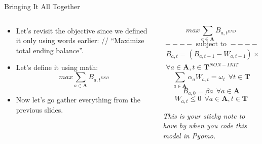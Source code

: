 \documentclass[10pt, aspectratio=169]{beamer}
\begin{document}
\begin{frame}{Bringing It All Together}
    \begin{columns}
        \begin{column}{0.5\textwidth}
            \begin{itemize}
                \item Let's revisit the objective since we defined it only using words earlier: // \enquote{Maximize total ending balance}.
                \item Let's define it using math:
                \pause
                $$max \sum_{a \in \textbf{A}} B_{a,t^{END}}$$
                \item Now let's go gather everything from the previous slides.
                \pause
            \end{itemize}
        \end{column}
        \begin{column}{0.5\textwidth}
            $$max \sum_{a \in \textbf{A}} B_{a,t^{END}}$$
            $$----\text{ subject to }----$$
            \begin{equation}
                \begin{split}
                B_{a,t} = \left(B_{a,t-1}-W_{a,t-1}\right) \times (1 + \delta_a) \\ \forall a \in \textbf{A}, t \in \textbf{T}^{NON-INIT}
                \end{split} \tag*{}
            \end{equation}
            $$\sum_{a \in \textbf{A}} \alpha_a W_{a,t} = \omega_t \ \ \forall t \in \textbf{T}$$
            $$B_{a,0} = \beta{a} \ \ \forall a \in \textbf{A}$$
            $$W_{a,t} \leq 0 \ \ \forall a \in \textbf{A}, t \in \textbf{T}$$
            \begin{center}
                \textit{This is your sticky note to have by when you code this model in Pyomo.}
            \end{center}
        \end{column}
    \end{columns}
\end{frame}
\end{document}
